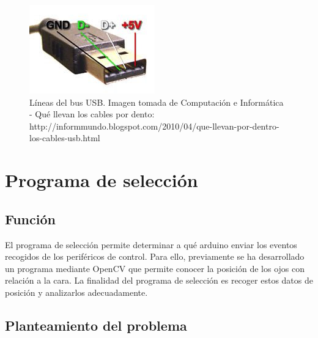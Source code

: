 \begin{figure}[p]
\centering
\includegraphics[scale = 0.7]{capitulo_02/figuras_dir/USB.jpg}
\caption{Líneas del bus USB. Imagen tomada de Computación e Informática - Qué llevan los cables por dento: http://informmundo.blogspot.com/2010/04/que-llevan-por-dentro-los-cables-usb.html}
\label{fig: USB}
\end{figure}


















\clearpage

\section{Programa de selección} \label{s2_4}

\subsection{Función} \label{s2_4_1}

El programa de selección permite determinar a qué arduino enviar los eventos recogidos de los periféricos de control. Para ello, previamente se ha desarrollado un programa mediante OpenCV que permite conocer la posición de los ojos con relación a la cara. La finalidad del programa de selección es recoger estos datos de posición y analizarlos adecuadamente.

\subsection{Planteamiento del problema} \label{s2_4_2}

